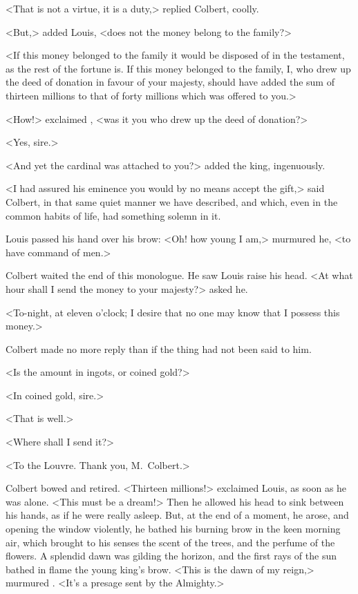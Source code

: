 <That is not a virtue, it is a duty,> replied Colbert, coolly.

<But,> added Louis, <does not the money belong to the family?>

<If this money belonged to the family it would be disposed of in the testament, as the rest of the fortune is. If this money belonged to the family, I, who drew up the deed of donation in favour of your majesty, should have added the sum of thirteen millions to that of forty millions which was offered to you.>

<How!> exclaimed , <was it you who drew up the deed of donation?>

<Yes, sire.>

<And yet the cardinal was attached to you?> added the king, ingenuously.

<I had assured his eminence you would by no means accept the gift,> said Colbert, in that same quiet manner we have described, and which, even in the common habits of life, had something solemn in it.

Louis passed his hand over his brow: <Oh! how young I am,> murmured he, <to have command of men.>

Colbert waited the end of this monologue. He saw Louis raise his head. <At what hour shall I send the money to your majesty?> asked he.

<To-night, at eleven o'clock; I desire that no one may know that I possess this money.>

Colbert made no more reply than if the thing had not been said to him.

<Is the amount in ingots, or coined gold?>

<In coined gold, sire.>

<That is well.>

<Where shall I send it?>

<To the Louvre. Thank you, M.~Colbert.>

Colbert bowed and retired. <Thirteen millions!> exclaimed Louis, as soon as he was alone. <This must be a dream!> Then he allowed his head to sink between his hands, as if he were really asleep. But, at the end of a moment, he arose, and opening the window violently, he bathed his burning brow in the keen morning air, which brought to his senses the scent of the trees, and the perfume of the flowers. A splendid dawn was gilding the horizon, and the first rays of the sun bathed in flame the young king's brow. <This is the dawn of my reign,> murmured . <It's a presage sent by the Almighty.> 